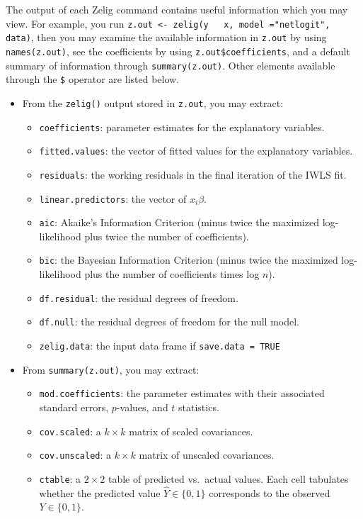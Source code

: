 The output of each Zelig command contains useful information which you
may view. For example, you run {\tt z.out <- zelig(y ~ x, model
="netlogit", data)}, then you may examine the available information in
{\tt z.out} by using {\tt names(z.out)}, see the coefficients by using
{\tt z.out\$coefficients}, and a default summary of information
through {\tt summary(z.out)}. Other elements available through the
{\tt \$} operator are listed below.
\begin{itemize} 
\item From the {\tt zelig()} output stored in {\tt z.out}, you may extract:
\begin{itemize}
\item {\tt coefficients}: parameter estimates for the explanatory variables.
\item {\tt fitted.values}: the vector of fitted values for the
explanatory variables. 
\item {\tt residuals}: the working residuals in the final iteration of
the IWLS fit.  
\item {\tt linear.predictors}: the vector of $x_{i}\beta$.
\item {\tt aic}: Akaike's Information Criterion (minus twice the
maximized log-likelihood plus twice the number of coefficients). 
\item {\tt bic}: the Bayesian Information Criterion (minus twice the
maximized log-likelihood plus the number of coefficients times log
$n$). 
\item {\tt df.residual}: the residual degrees of freedom.
\item {\tt df.null}: the residual degrees of freedom for the null model. 
\item {\tt zelig.data}: the input data frame if {\tt save.data = TRUE} 
\end{itemize} 
\item From {\tt summary(z.out)}, you may extract:
\begin{itemize}
\item {\tt mod.coefficients}: the parameter estimates with their associated standard errors, $p$-values, and $t$ statistics. 
\item {\tt cov.scaled}: a $k \times k$ matrix of scaled covariances.
\item {\tt cov.unscaled}: a $k \times k$ matrix of unscaled
covariances. 
\item {\tt ctable}: a $2 \times 2$ table of predicted vs.\ actual
values.  Each cell tabulates whether the predicted value $\widehat{Y}
\in \{0,1\}$ corresponds to the observed $Y \in \{0,1\}$. 

\end{itemize}
\end{itemize}
